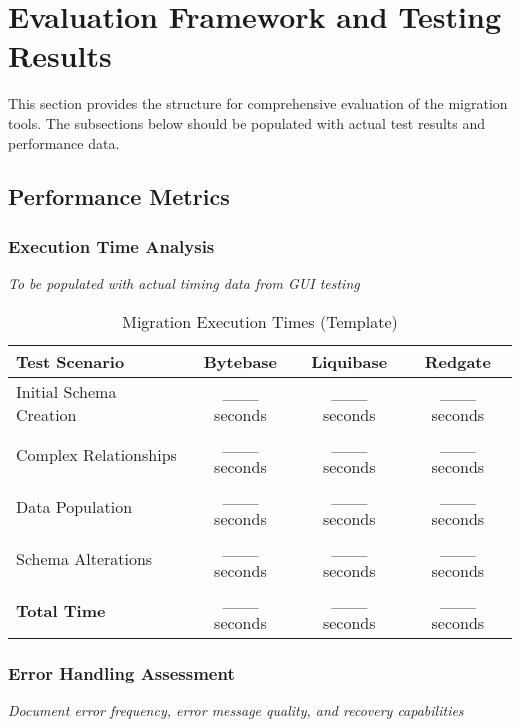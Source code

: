 \documentclass[11pt,a4paper]{article}
\begin{document}
\section{Evaluation Framework and Testing Results}

This section provides the structure for comprehensive evaluation of the migration tools. The subsections below should be populated with actual test results and performance data.

\subsection{Performance Metrics}

\subsubsection{Execution Time Analysis}
\textit{To be populated with actual timing data from GUI testing}

\begin{table}[H]
\centering
\caption{Migration Execution Times (Template)}
\begin{tabular}{|l|c|c|c|}
\hline
\textbf{Test Scenario} & \textbf{\textcolor{bytebase}{Bytebase}} & \textbf{\textcolor{liquibase}{Liquibase}} & \textbf{\textcolor{redgate}{Redgate}} \\
\hline
Initial Schema Creation & \_\_\_ seconds & \_\_\_ seconds & \_\_\_ seconds \\
\hline
Complex Relationships & \_\_\_ seconds & \_\_\_ seconds & \_\_\_ seconds \\
\hline
Data Population & \_\_\_ seconds & \_\_\_ seconds & \_\_\_ seconds \\
\hline
Schema Alterations & \_\_\_ seconds & \_\_\_ seconds & \_\_\_ seconds \\
\hline
\textbf{Total Time} & \_\_\_ seconds & \_\_\_ seconds & \_\_\_ seconds \\
\hline
\end{tabular}
\end{table}

\subsubsection{Error Handling Assessment}
\textit{Document error frequency, error message quality, and recovery capabilities}
\end{document}
